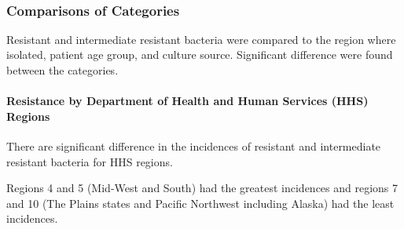 \documentclass[11pt]{article}
\begin{document}
    \begin{center}
    \end{center}
    { \hspace*{\fill} \\}
    
    \hypertarget{comparisons-of-categories}{%
\subsubsection{Comparisons of
Categories}\label{comparisons-of-categories}}

    Resistant and intermediate resistant bacteria were compared to the
region where isolated, patient age group, and culture source.
Significant difference were found between the categories.

    \hypertarget{resistance-by-department-of-health-and-human-services-hhs-regions}{%
\paragraph{Resistance by Department of Health and Human Services (HHS)
Regions}\label{resistance-by-department-of-health-and-human-services-hhs-regions}}

    There are significant difference in the incidences of resistant and
intermediate resistant bacteria for HHS regions.

Regions 4 and 5 (Mid-West and South) had the greatest incidences and
regions 7 and 10 (The Plains states and Pacific Northwest including
Alaska) had the least incidences.
\end{document}
